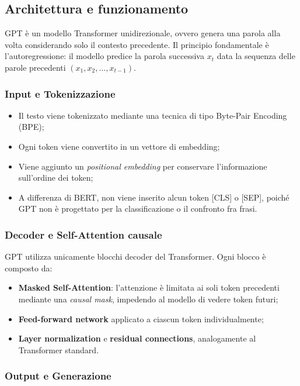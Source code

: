 \subsection{Architettura e funzionamento}

GPT è un modello Transformer unidirezionale, ovvero genera una parola alla volta considerando solo il contesto precedente. Il principio fondamentale è l'autoregressione: il modello predice la parola successiva $x_t$ data la sequenza delle parole precedenti $(x_1, x_2, ..., x_{t-1})$.

\subsubsection{Input e Tokenizzazione}

\begin{itemize}
    \item Il testo viene tokenizzato mediante una tecnica di tipo Byte-Pair Encoding (BPE);
    \item Ogni token viene convertito in un vettore di embedding;
    \item Viene aggiunto un \textit{positional embedding} per conservare l’informazione sull’ordine dei token;
    \item A differenza di BERT, non viene inserito alcun token [CLS] o [SEP], poiché GPT non è progettato per la classificazione o il confronto fra frasi.
\end{itemize}

\subsubsection{Decoder e Self-Attention causale}

GPT utilizza unicamente blocchi decoder del Transformer. Ogni blocco è composto da:
\begin{itemize}
    \item \textbf{Masked Self-Attention}: l'attenzione è limitata ai soli token precedenti mediante una \textit{causal mask}, impedendo al modello di vedere token futuri;
    \item \textbf{Feed-forward network} applicato a ciascun token individualmente;
    \item \textbf{Layer normalization} e \textbf{residual connections}, analogamente al Transformer standard.
\end{itemize}

\subsubsection{Output e Generazione}

